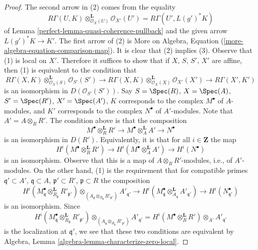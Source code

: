 \begin{proof}

The second arrow in (2) comes from the equality
$$
R\Gamma(U, K) \otimes_{\mathcal{O}_X(U)}^\mathbf{L} \mathcal{O}_{X'}(U') =
R\Gamma(U', L(g')^*K)
$$
of Lemma \ref{perfect-lemma-quasi-coherence-pullback} and the given arrow
$L(g')^*K \to K'$. The first arrow of (2) is
More on Algebra, Equation (\ref{more-algebra-equation-comparison-map}).
It is clear that (2) implies (3). Observe that (1) is local on $X'$.
Therefore it suffices to show that if $X$, $S$, $S'$, $X'$ are affine, then
(1) is equivalent to the condition that
$$
R\Gamma(X, K) \otimes_{\mathcal{O}_S(S)}^\mathbf{L} \mathcal{O}_{S'}(S')
\to
R\Gamma(X, K) \otimes_{\mathcal{O}_X(X)}^\mathbf{L} \mathcal{O}_{X'}(X')
\to
R\Gamma(X', K')
$$
is an isomorphism in $D(\mathcal{O}_{S'}(S'))$. Say
$S = \Spec(R)$, $X = \Spec(A)$, $S' = \Spec(R')$, $X' = \Spec(A')$,
$K$ corresponds to the complex $M^\bullet$ of $A$-modules, and
$K'$ corresponds to the complex $N^\bullet$ of $A'$-modules.
Note that $A' = A \otimes_R R'$. The condition above is that the composition
$$
M^\bullet \otimes_R^\mathbf{L} R' \to
M^\bullet \otimes_A^\mathbf{L} A' \to
N^\bullet
$$
is an isomorphism in $D(R')$. Equivalently, it is that for all
$i \in \mathbf{Z}$ the map
$$
H^i(M^\bullet \otimes_R^\mathbf{L} R') \to
H^i(M^\bullet \otimes_A^\mathbf{L} A') \to
H^i(N^\bullet)
$$
is an isomorphism. Observe that this is a map of $A \otimes_R R'$-modules,
i.e., of $A'$-modules. On the other hand, (1) is the requirement
that for compatible primes
$\mathfrak q' \subset A'$, $\mathfrak q \subset A$,
$\mathfrak p' \subset R'$, $\mathfrak p \subset R$
the composition
$$
H^i(M^\bullet_\mathfrak q \otimes_{R_\mathfrak p}^\mathbf{L} R'_{\mathfrak p'})
\otimes_{(A_\mathfrak q \otimes_{R_\mathfrak p} R'_{\mathfrak p'})}
A'_{\mathfrak q'} \to
H^i(M^\bullet_{\mathfrak q}
\otimes_{A_\mathfrak q}^\mathbf{L} A'_{\mathfrak q'})
\to H^i(N^\bullet_{\mathfrak q'})
$$
is an isomorphism. Since
$$
H^i(M^\bullet_\mathfrak q \otimes_{R_\mathfrak p}^\mathbf{L} R'_{\mathfrak p'})
\otimes_{(A_\mathfrak q \otimes_{R_\mathfrak p} R'_{\mathfrak p'})}
A'_{\mathfrak q'} =
H^i(M^\bullet \otimes_R^\mathbf{L} R') \otimes_{A'} A'_{\mathfrak q'}
$$
is the localization at $\mathfrak q'$,
we see that these two conditions are equivalent by
Algebra, Lemma \ref{algebra-lemma-characterize-zero-local}.
\end{proof}

